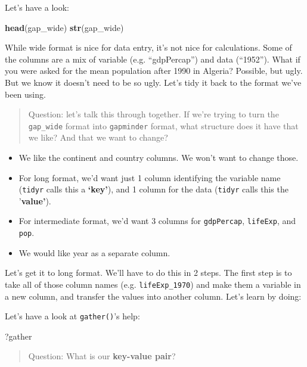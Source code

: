 \documentclass[]{book}
\newenvironment{Shaded}{\begin{snugshade}}{\end{snugshade}}
\newcommand{\KeywordTok}[1]{\textcolor[rgb]{0.13,0.29,0.53}{\textbf{#1}}}
\newcommand{\NormalTok}[1]{#1}
\providecommand{\tightlist}{%
  \setlength{\itemsep}{0pt}\setlength{\parskip}{0pt}}
\theoremstyle{definition}
\theoremstyle{definition}
\theoremstyle{definition}
\theoremstyle{remark}
\begin{document}
Let's have a look:

\begin{Shaded}
\begin{Highlighting}[]
\KeywordTok{head}\NormalTok{(gap_wide)}
\KeywordTok{str}\NormalTok{(gap_wide)}
\end{Highlighting}
\end{Shaded}

While wide format is nice for data entry, it's not nice for
calculations. Some of the columns are a mix of variable (e.g.
``gdpPercap'') and data (``1952''). What if you were asked for the mean
population after 1990 in Algeria? Possible, but ugly. But we know it
doesn't need to be so ugly. Let's tidy it back to the format we've been
using.

\begin{quote}
Question: let's talk this through together. If we're trying to turn the
\texttt{gap\_wide} format into \texttt{gapminder} format, what structure
does it have that we like? And that we want to change?
\end{quote}

\begin{itemize}
\tightlist
\item
  We like the continent and country columns. We won't want to change
  those.
\item
  For long format, we'd want just 1 column identifying the variable name
  (\texttt{tidyr} calls this a \textbf{`key'}), and 1 column for the
  data (\texttt{tidyr} calls this the '\textbf{value'}).
\item
  For intermediate format, we'd want 3 columns for \texttt{gdpPercap},
  \texttt{lifeExp}, and \texttt{pop}.
\item
  We would like year as a separate column.
\end{itemize}

Let's get it to long format. We'll have to do this in 2 steps. The first
step is to take all of those column names (e.g. \texttt{lifeExp\_1970})
and make them a variable in a new column, and transfer the values into
another column. Let's learn by doing:

Let's have a look at \texttt{gather()}'s help:

\begin{Shaded}
\begin{Highlighting}[]
\NormalTok{?gather}
\end{Highlighting}
\end{Shaded}

\begin{quote}
Question: What is our \textbf{key-value pair}?
\end{quote}
\end{document}
